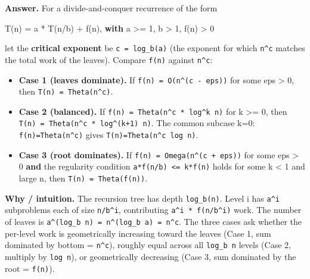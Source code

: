 \documentclass[11pt]{article}
\providecommand{\tightlist}{\setlength{\itemsep}{1pt}\setlength{\parskip}{0pt}}
\newenvironment{Shaded}{\begin{snugshade}}{\end{snugshade}}
\newcommand{\ControlFlowTok}[1]{\textcolor[rgb]{0.99,0.74,0.29}{\textbf{#1}}}
\newcommand{\DecValTok}[1]{\textcolor[rgb]{0.96,0.45,0.00}{#1}}
\newcommand{\NormalTok}[1]{\textcolor[rgb]{0.81,0.81,0.76}{#1}}
\newcommand{\OperatorTok}[1]{\textcolor[rgb]{0.81,0.81,0.76}{#1}}
\begin{document}
\textbf{Answer.} For a divide-and-conquer recurrence of the form


\begin{Shaded}
\begin{Highlighting}[]
\NormalTok{T(n) }\OperatorTok{=}\NormalTok{ a }\OperatorTok{*}\NormalTok{ T(n}\OperatorTok{/}\NormalTok{b) }\OperatorTok{+}\NormalTok{ f(n),   }\ControlFlowTok{with}\NormalTok{ a }\OperatorTok{\textgreater{}=} \DecValTok{1}\NormalTok{, b }\OperatorTok{\textgreater{}} \DecValTok{1}\NormalTok{, f(n) }\OperatorTok{\textgreater{}} \DecValTok{0}
\end{Highlighting}
\end{Shaded}

let the \textbf{critical exponent} be \texttt{c\ =\ log\_b(a)} (the exponent for which \texttt{n\^{}c} matches the total work of the leaves). Compare \texttt{f(n)} against \texttt{n\^{}c}:

\begin{itemize}
\tightlist
\item
  \textbf{Case 1 (leaves dominate).} If \texttt{f(n)\ =\ O(n\^{}(c\ -\ eps))} for some eps \textgreater{} 0, then \texttt{T(n)\ =\ Theta(n\^{}c)}.
\item
  \textbf{Case 2 (balanced).} If \texttt{f(n)\ =\ Theta(n\^{}c\ *\ log\^{}k\ n)} for k \textgreater= 0, then \texttt{T(n)\ =\ Theta(n\^{}c\ *\ log\^{}(k+1)\ n)}. The common subcase k=0: \texttt{f(n)=Theta(n\^{}c)} gives \texttt{T(n)=Theta(n\^{}c\ log\ n)}.
\item
  \textbf{Case 3 (root dominates).} If \texttt{f(n)\ =\ Omega(n\^{}(c\ +\ eps))} for some eps \textgreater{} 0 \textbf{and} the regularity condition \texttt{a*f(n/b)\ \textless{}=\ k*f(n)} holds for some k \textless{} 1 and large n, then \texttt{T(n)\ =\ Theta(f(n))}.
\end{itemize}

\textbf{Why / intuition.} The recursion tree has depth \texttt{log\_b(n)}. Level i has \texttt{a\^{}i} subproblems each of size \texttt{n/b\^{}i}, contributing \texttt{a\^{}i\ *\ f(n/b\^{}i)} work. The number of leaves is \texttt{a\^{}(log\_b\ n)\ =\ n\^{}(log\_b\ a)\ =\ n\^{}c}. The three cases ask whether the per-level work is geometrically increasing toward the leaves (Case 1, sum dominated by bottom = \texttt{n\^{}c}), roughly equal across all \texttt{log\_b\ n} levels (Case 2, multiply by \texttt{log\ n}), or geometrically decreasing (Case 3, sum dominated by the root = \texttt{f(n)}).
\end{document}
